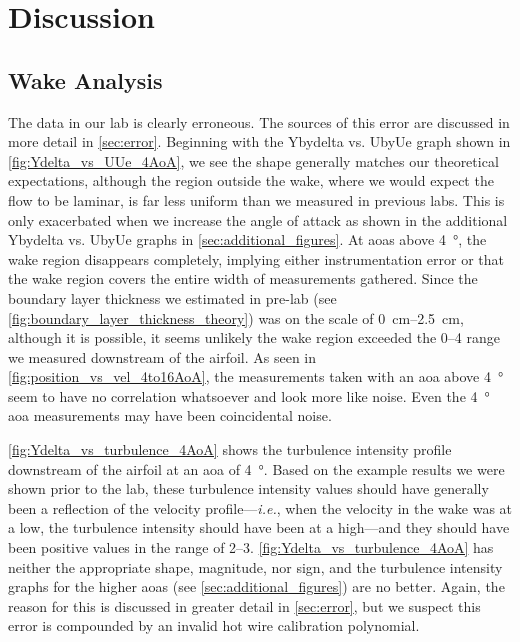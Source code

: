 \chapter{Discussion}
\label{cp:discussion}

\section{Wake Analysis}

The data in our lab is clearly erroneous. The sources of this error are discussed in more detail in \autoref{sec:error}. Beginning with the \gls{Ybydelta} vs. \gls{UbyUe} graph shown in \autoref{fig:Ydelta_vs_UUe_4AoA}, we see the shape generally matches our theoretical expectations, although the region outside the wake, where we would expect the flow to be laminar, is far less uniform than we measured in previous labs. This is only exacerbated when we increase the angle of attack as shown in the additional \gls{Ybydelta} vs. \gls{UbyUe} graphs in \autoref{sec:additional_figures}. At \acrshort{aoa}s above \qty{4}{\degree}, the wake region disappears completely, implying either instrumentation error or that the wake region covers the entire width of measurements gathered. Since the boundary layer thickness we estimated in pre-lab (see \autoref{fig:boundary_layer_thickness_theory}) was on the scale of \qtyrange{0}{2.5}{\centi\meter}, although it is possible, it seems unlikely the wake region exceeded the \qtyrange{0}{4}{} range we measured downstream of the airfoil. As seen in \autoref{fig:position_vs_vel_4to16AoA}, the measurements taken with an \acrshort{aoa} above \qty{4}{\degree} seem to have no correlation whatsoever and look more like noise. Even the \qty{4}{\degree} \acrshort{aoa} measurements may have been coincidental noise.

\autoref{fig:Ydelta_vs_turbulence_4AoA} shows the turbulence intensity profile downstream of the airfoil at an \acrshort{aoa} of \qty{4}{\degree}. Based on the example results we were shown prior to the lab, these turbulence intensity values should have generally been a reflection of the velocity profile—\textit{i.e.}, when the velocity in the wake was at a low, the turbulence intensity should have been at a high—and they should have been positive values in the range of \numrange{2}{3}. \autoref{fig:Ydelta_vs_turbulence_4AoA} has neither the appropriate shape, magnitude, nor sign, and the turbulence intensity graphs for the higher \acrshort{aoa}s (see \autoref{sec:additional_figures}) are no better. Again, the reason for this is discussed in greater detail in \autoref{sec:error}, but we suspect this error is compounded by an invalid hot wire calibration polynomial.

